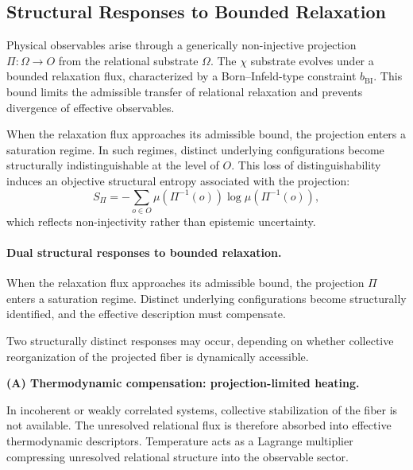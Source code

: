 \subsection{Structural Responses to Bounded Relaxation}
  \label{subsec:structural-interpretation-projective-thermodynamics}

  Physical observables arise through a generically non-injective projection
  $\Pi : \Omega \rightarrow O$ from the relational substrate $\Omega$.
  The $\chi$ substrate evolves under a bounded relaxation flux,
  characterized by a Born--Infeld-type constraint $b_{\mathrm{BI}}$.
  This bound limits the admissible transfer of relational relaxation
  and prevents divergence of effective observables.

  When the relaxation flux approaches its admissible bound,
  the projection enters a saturation regime.
  In such regimes, distinct underlying configurations
  become structurally indistinguishable at the level of $O$.
  This loss of distinguishability induces an objective structural entropy
  associated with the projection:
  \begin{equation}
    S_{\Pi} = -\sum_{o \in O}
    \mu(\Pi^{-1}(o)) \log \mu(\Pi^{-1}(o)),
  \end{equation}
  which reflects non-injectivity rather than epistemic uncertainty.

  \paragraph{Dual structural responses to bounded relaxation.}

    When the relaxation flux approaches its admissible bound,
    the projection $\Pi$ enters a saturation regime.
    Distinct underlying configurations become structurally identified,
    and the effective description must compensate.

    Two structurally distinct responses may occur,
    depending on whether collective reorganization of the projected fiber
    is dynamically accessible.

    \medskip
    \textbf{(A) Thermodynamic compensation: projection-limited heating.}

    In incoherent or weakly correlated systems,
    collective stabilization of the fiber is not available.
    The unresolved relational flux is therefore absorbed into
    effective thermodynamic descriptors.
    Temperature acts as a Lagrange multiplier compressing
    unresolved relational structure into the observable sector.


